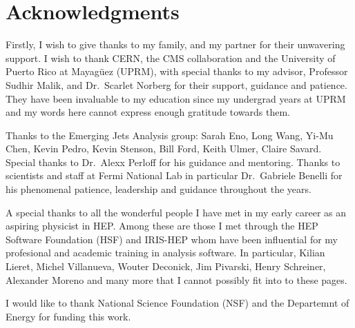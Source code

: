 \chapter*{Acknowledgments}

Firstly, I wish to give thanks to my family, and my partner for their unwavering support.
I wish to thank CERN, the CMS collaboration and the University of Puerto Rico at Mayagüez (UPRM), with special thanks to my advisor, Professor Sudhir Malik, and Dr.~Scarlet Norberg for their support, guidance and patience. They have been invaluable to my education since my undergrad years at UPRM and my words here cannot express enough gratitude towards them.

Thanks to the Emerging Jets Analysis group: Sarah Eno, Long Wang, Yi-Mu Chen, Kevin Pedro, Kevin Stenson, Bill Ford, Keith Ulmer, Claire Savard. Special thanks to Dr.~Alexx Perloff for his guidance and mentoring. Thanks to scientists and staff at Fermi National Lab in particular Dr.~Gabriele Benelli for his phenomenal patience, leadership and guidance throughout the years.

A special thanks to all the wonderful people I have met in my early career as an aspiring physicist in HEP. Among these are those I met through the HEP Software Foundation (HSF) and IRIS-HEP whom have been influential for my profesional and academic training in analysis software. In particular, Kilian Lieret, Michel Villanueva, Wouter Deconick, Jim Pivarski, Henry Schreiner, Alexander Moreno and many more that I cannot possibly fit into to these pages.

I would like to thank National Science Foundation (NSF) and the Departemnt of Energy for funding this work.
